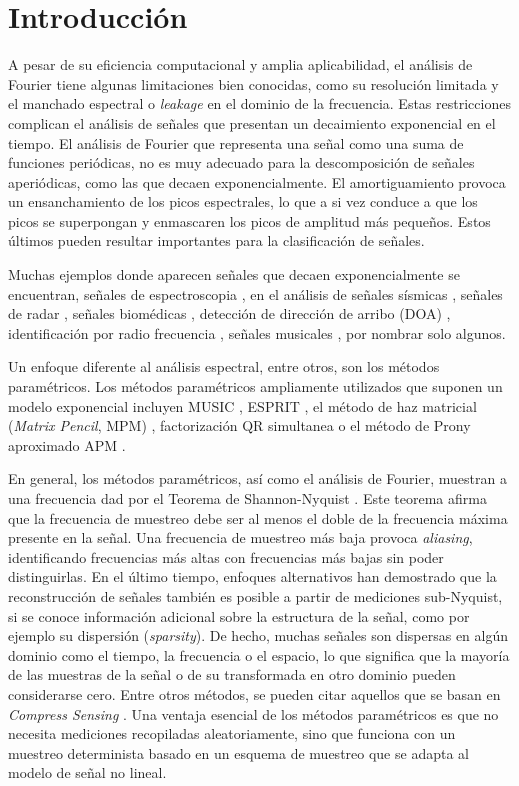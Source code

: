 \chapter{Introducción}\label{chap:Introduccion}

A pesar de su eficiencia computacional y amplia aplicabilidad, el análisis de Fourier tiene algunas limitaciones bien conocidas, como su resolución limitada y el manchado espectral o \emph{leakage} en el dominio de la frecuencia. Estas restricciones complican el análisis de señales que presentan un decaimiento exponencial en el tiempo. El análisis de Fourier que representa una señal como una suma de funciones periódicas, no es muy adecuado para la descomposición de señales aperiódicas, como las que decaen exponencialmente. El amortiguamiento provoca un ensanchamiento de los picos espectrales, lo que a si vez conduce a que los picos se superpongan y enmascaren los picos de amplitud más pequeños. Estos últimos pueden resultar importantes para la clasificación de señales. 

Muchas ejemplos donde aparecen señales que decaen exponencialmente se encuentran, señales de espectroscopia \cite{Gudmundson2012}, en el análisis de señales sísmicas \cite{Soltaninejad2020}, señales de radar \cite{Cuyt2020, Sarkar2000}, señales biomédicas \cite{Bannis2014, Chon2001}, detección de dirección de arribo (DOA) \cite{Knaepkens2020}, identificación por radio frecuencia \cite{Rezaiesarlak2013}, señales musicales \cite{Laroche1993}, por nombrar solo algunos. 

Un enfoque diferente al análisis espectral, entre otros, son los métodos paramétricos. Los métodos paramétricos ampliamente utilizados que suponen un modelo exponencial incluyen MUSIC \cite{Schmidt1986}, ESPRIT \cite{Roy1989}, el método de haz matricial (\emph{Matrix Pencil}, MPM) \cite{Hua1990}, factorización QR simultanea  \cite{Golub1999} o el método de Prony aproximado APM \cite{Potts2010}.

En general, los métodos paramétricos, así como el análisis de Fourier, muestran a una frecuencia dad por el Teorema de Shannon-Nyquist \cite{Nyquist1928, Shannon1949}. Este teorema afirma que la frecuencia de muestreo debe ser al menos el doble de la frecuencia máxima presente en la señal. Una frecuencia de muestreo más baja provoca \emph{aliasing}, identificando frecuencias más altas con frecuencias más bajas sin poder distinguirlas. En el último tiempo, enfoques alternativos han demostrado que la reconstrucción de señales también es posible a partir de mediciones sub-Nyquist, si se conoce información adicional sobre la estructura de la señal, como por ejemplo su dispersión (\emph{sparsity}). De hecho, muchas señales son dispersas en algún dominio como el tiempo, la frecuencia o el espacio, lo que significa que la mayoría de las muestras de la señal o de su transformada en otro dominio pueden considerarse cero. Entre otros métodos, se pueden citar aquellos que se basan en \emph{Compress Sensing} \cite{Donoho2006}. Una ventaja esencial de los métodos paramétricos es que no necesita mediciones recopiladas aleatoriamente, sino que funciona con un muestreo determinista basado en un esquema de muestreo que se adapta al modelo de señal no lineal.

